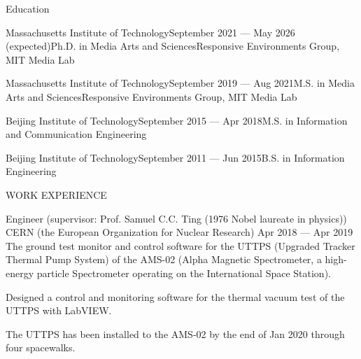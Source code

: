 \documentclass{resume} %
\begin{document}
\begin{rSection}{Education}

\begin{rSubsection}{Massachusetts Institute of Technology}{September 2021 --- May 2026 (expected)}{Ph.D. in Media Arts and Sciences}{Responsive Environments Group, MIT Media Lab}
\vspace{-.65cm}
\item[]
\end{rSubsection}

\begin{rSubsection}{Massachusetts Institute of Technology}{September 2019 --- Aug 2021}{M.S. in Media Arts and Sciences}{Responsive Environments Group, MIT Media Lab}
\vspace{-.65cm}
\item[]
\end{rSubsection}

\begin{rSubsection}{Beijing Institute of Technology}{September 2015 --- Apr 2018}{M.S. in Information and Communication Engineering}{}
\vspace{-.65cm}
\item[]
\end{rSubsection}

\begin{rSubsection}{Beijing Institute of Technology}{September 2011 --- Jun 2015}{B.S. in Information Engineering}{}
\vspace{-.65cm}
\item[]
\end{rSubsection}

\end{rSection}

\begin{rSection}{WORK EXPERIENCE}
\begin{rSubsection}{Engineer (supervisor: Prof. Samuel C.C. Ting (1976 Nobel laureate in physics))}{}
      {CERN (the European Organization for Nuclear Research)}
      {Apr 2018 --- Apr 2019}
      {The ground test monitor and control software for the UTTPS (Upgraded Tracker Thermal Pump System) of the AMS-02
      (Alpha Magnetic Spectrometer, a high-energy particle Spectrometer operating on the International Space Station).}
\item Designed a control and monitoring software for the thermal vacuum test of the UTTPS with LabVIEW.
\item The UTTPS has been installed to the AMS-02 by the end of Jan 2020 through four spacewalks.
\end{rSubsection}
\end{rSection}
\end{document}
